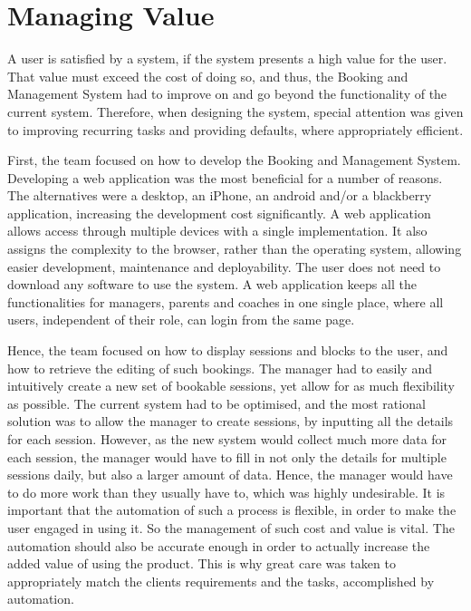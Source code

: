 \documentclass{l3proj}
\begin{document}
\section{Managing Value}
\par
A user is satisfied by a system, if the system presents a high value for the user. That value must exceed the cost of doing so, and thus, the Booking and Management System had  to improve on and go beyond the functionality of the current system. Therefore, when designing the system, special attention was given to improving recurring tasks and providing defaults, where appropriately efficient. \\
\par First, the team focused on how to develop the Booking and Management System. Developing a web application was the most beneficial for a number of reasons. The alternatives were a desktop, an iPhone, an android and/or a blackberry application, increasing the development cost significantly. A web application allows access through multiple devices with a single implementation. It also assigns the complexity to the browser, rather than the operating system, allowing easier development, maintenance and deployability. The user does not need to download any software to use the system. A web application keeps all the functionalities for managers, parents and coaches in one single place, where all users, independent of their role, can login from the same page.\\
\par Hence, the team focused on how to display sessions and blocks to the user, and how to retrieve the editing of such bookings. The manager had to easily and intuitively create a new set of bookable sessions, yet allow for as much flexibility as possible. The current system had to be optimised, and the most rational solution was to allow the manager to create sessions, by inputting all the details for each session. However, as the new system would collect much more data for each session, the manager would have to fill in not only the details for multiple sessions daily, but also a larger amount of data. Hence, the manager would have to do more work than they usually have to, which was highly undesirable. It is important that the automation of such a process is flexible, in order to make the user engaged in using it. So the management of such cost and value is vital. The automation should also be accurate enough in order to actually increase the added value of using the product. This is why great care was taken to appropriately match the clients requirements and the tasks, accomplished by automation.\\
\end{document}
